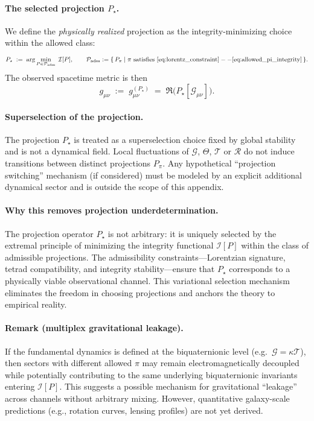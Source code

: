 \paragraph{The selected projection $P_\star$.}
We define the \emph{physically realized} projection as the integrity-minimizing choice within the allowed class:
\begin{equation}
P_\star \;:=\; \arg\min_{P\in\mathcal{P}_{\mathrm{adm}}}\; \mathcal{I}[P],
\qquad
\mathcal{P}_{\mathrm{adm}} := \{\,P_\pi \;|\; \pi \text{ satisfies } \eqref{eq:lorentz_constraint}--\eqref{eq:allowed_pi_integrity}\,\}.
\label{eq:Pstar_def}
\end{equation}
The observed spacetime metric is then
\begin{equation}
g_{\mu\nu} \;:=\; g^{(P_\star)}_{\mu\nu} \;=\; \Re\!\Big(P_\star[\mathcal{G}_{\mu\nu}]\Big).
\label{eq:observed_metric_Pstar}
\end{equation}

\paragraph{Superselection of the projection.}
The projection $P_\star$ is treated as a superselection choice fixed by global stability and is not a dynamical field.
Local fluctuations of $\mathcal{G}$, $\Theta$, $\mathcal{T}$ or $\mathcal{R}$ do not induce transitions between distinct projections $P_\pi$.
Any hypothetical ``projection switching'' mechanism (if considered) must be modeled by an explicit additional dynamical sector and is outside the scope of this appendix.

\paragraph{Why this removes projection underdetermination.}
The projection operator $P_\star$ is not arbitrary: it is uniquely selected by the extremal principle of minimizing the integrity functional $\mathcal{I}[P]$ within the class of admissible projections. The admissibility constraints—Lorentzian signature, tetrad compatibility, and integrity stability—ensure that $P_\star$ corresponds to a physically viable observational channel. This variational selection mechanism eliminates the freedom in choosing projections and anchors the theory to empirical reality.

\paragraph{Remark (multiplex gravitational leakage).}
If the fundamental dynamics is defined at the biquaternionic level (e.g.\ $\mathcal{G}=\kappa\mathcal{T}$),
then sectors with different allowed $\pi$ may remain electromagnetically decoupled
while potentially contributing to the same underlying biquaternionic invariants entering $\mathcal{I}[P]$.
This suggests a possible mechanism for gravitational ``leakage'' across channels without arbitrary mixing.
However, quantitative galaxy-scale predictions (e.g., rotation curves, lensing profiles) are not yet derived.

